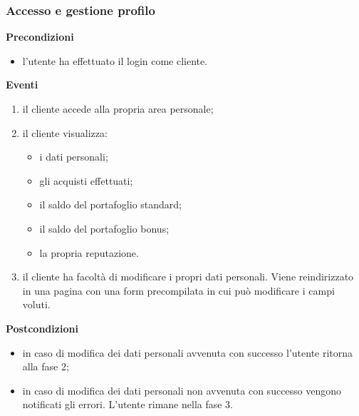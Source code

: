\documentclass[a4paper, 14pt]{article}
\begin{document}
\begin{flushleft}
			\subsubsection{Accesso e gestione profilo}
			\textbf{Precondizioni}
			\begin{itemize}
				\item l'utente ha effettuato il login come cliente.
			\end{itemize}
			\textbf{Eventi}
			\begin{enumerate}
				\item il cliente accede alla propria area personale;
				\item il cliente visualizza:
					\begin{itemize}
						\item i dati personali;
						\item gli acquisti effettuati;
						\item il saldo del portafoglio standard;
						\item il saldo del portafoglio bonus; 
						\item la propria reputazione.
					\end{itemize} 
				\item il cliente ha facoltà di modificare i propri dati personali. Viene reindirizzato 
					  in una pagina con una form precompilata in cui può modificare i campi voluti.
			\end{enumerate}
			\textbf{Postcondizioni}
			\begin{itemize}
				\item in caso di modifica dei dati personali avvenuta con successo l'utente ritorna alla fase 2;
				\item in caso di modifica dei dati personali non avvenuta con successo vengono notificati gli errori. L'utente rimane nella fase 3.
			\end{itemize}
		
			\bigskip

\end{flushleft}
\end{document}
